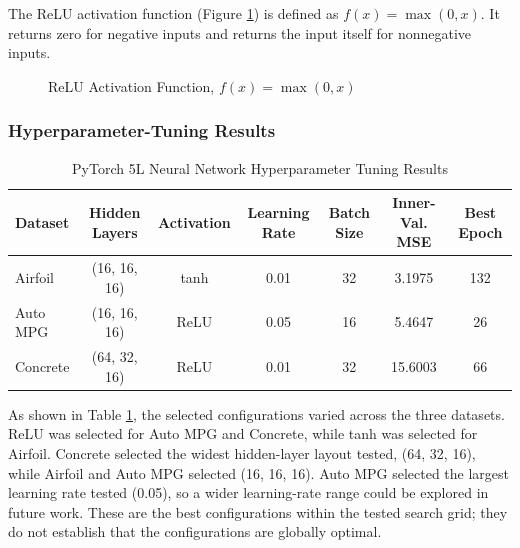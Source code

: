 \documentclass{article}
\begin{document}
The ReLU activation function (Figure \ref{fig:relu}) is defined as $f(x) = \max(0, x)$. It returns zero for negative inputs and returns the input itself for nonnegative inputs.
\begin{figure}[H]
    \centering
    \caption{ReLU Activation Function, $f(x) = \max(0, x)$}
    \label{fig:relu}
\end{figure}

\subsubsection{Hyperparameter-Tuning Results}
\begin{table}[H]
    \centering
    \caption{PyTorch 5L Neural Network Hyperparameter Tuning Results}
    \label{tab:pytorch5l_hyperparameters}
    \small
    \begin{tabular}{lcccccc}
        \hline
        \textbf{Dataset} & \textbf{Hidden Layers} & \textbf{Activation} & \textbf{Learning Rate} & \textbf{Batch Size} & \textbf{Inner-Val. MSE} & \textbf{Best Epoch} \\
        \hline
        Airfoil  & (16, 16, 16) & tanh & 0.01 & 32 & 3.1975 & 132 \\
        Auto MPG & (16, 16, 16) & ReLU & 0.05 & 16 & 5.4647 & 26 \\
        Concrete & (64, 32, 16) & ReLU & 0.01 & 32 & 15.6003 & 66 \\
        \hline
    \end{tabular}
\end{table}

As shown in Table \ref{tab:pytorch5l_hyperparameters}, the selected configurations varied across the three datasets. ReLU was selected for Auto MPG and Concrete, while tanh was selected for Airfoil. Concrete selected the widest hidden-layer layout tested, (64, 32, 16), while Airfoil and Auto MPG selected (16, 16, 16). Auto MPG selected the largest learning rate tested (0.05), so a wider learning-rate range could be explored in future work. These are the best configurations within the tested search grid; they do not establish that the configurations are globally optimal.
\end{document}

